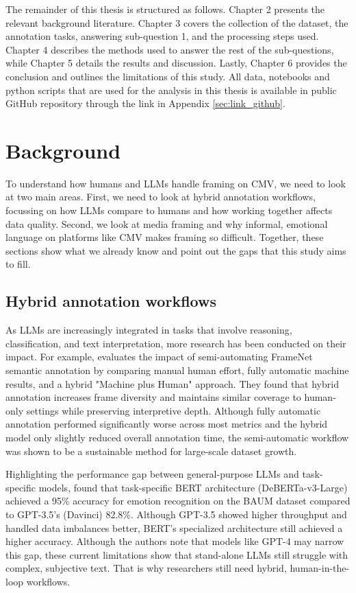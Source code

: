 \documentclass[
10pt, %
a4paper, %
oneside, %
headinclude,footinclude, %
] {book}%
\begin{document}
The remainder of this thesis is structured as follows. Chapter 2 presents the relevant background literature. Chapter 3 covers the collection of the dataset, the annotation tasks, answering sub-question 1, and the processing steps used. Chapter 4 describes the methods used to answer the rest of the sub-questions, while Chapter 5 details the results and discussion. Lastly, Chapter 6 provides the conclusion and outlines the limitations of this study. All data, notebooks and python scripts that are used for the analysis in this thesis is available in public GitHub repository through the link in Appendix \ref{sec:link_github}.




\chapter{Background}
To understand how humans and LLMs handle framing on CMV, we need to look at two main areas. First, we need to look at hybrid annotation workflows, focussing on how LLMs compare to humans and how working together affects data quality. Second, we look at media framing and why informal, emotional language on platforms like CMV makes framing so difficult. Together, these sections show what we already know and point out the gaps that this study aims to fill.

\section{Hybrid annotation workflows}
As LLMs are increasingly integrated in tasks that involve reasoning, classification, and text interpretation, more research has been conducted on their impact. For example, \cite{belcavello2025evaluating} evaluates the impact of semi-automating FrameNet semantic annotation by comparing manual human effort, fully automatic machine results, and a hybrid "Machine plus Human" approach. They found that hybrid annotation increases frame diversity and maintains similar coverage to human-only settings while preserving interpretive depth. Although fully automatic annotation performed significantly worse across most metrics and the hybrid model only slightly reduced overall annotation time, the semi-automatic workflow was shown to be a sustainable method for large-scale dataset growth. 

Highlighting the performance gap between general-purpose LLMs and task-specific models, \cite{boitel2023comparative} found that task-specific BERT architecture (DeBERTa-v3-Large) achieved a 95\% accuracy for emotion recognition on the BAUM dataset compared to GPT-3.5's (Davinci) 82.8\%. Although GPT-3.5 showed higher throughput and handled data imbalances better, BERT's specialized architecture still achieved a higher accuracy. Although the authors note that models like GPT-4 may narrow this gap, these current limitations show that stand-alone LLMs still struggle with complex, subjective text. That is why researchers still need hybrid, human-in-the-loop workflows.
\end{document}
